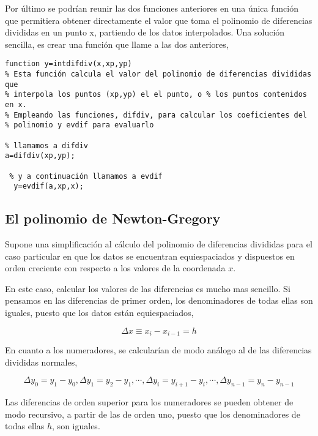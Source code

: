 Por último se podrían reunir las dos funciones anteriores en una única función que permitiera obtener directamente el valor que toma el polinomio de diferencias divididas en un punto x, partiendo de los datos interpolados. Una solución sencilla, es crear una función que llame a las dos anteriores,

\begin{lstlisting}
function y=intdifdiv(x,xp,yp)
% Esta función calcula el valor del polinomio de diferencias divididas que 
% interpola los puntos (xp,yp) el el punto, o % los puntos contenidos en x. 
% Empleando las funciones, difdiv, para calcular los coeficientes del
% polinomio y evdif para evaluarlo

% llamamos a difdiv
a=difdiv(xp,yp);
 
 % y a continuación llamamos a evdif
  y=evdif(a,xp,x);
 \end{lstlisting} 
 
 \subsection{El polinomio de Newton-Gregory} \label{sec:newgre}  
 Supone una simplificación al cálculo del polinomio de diferencias divididas para el caso particular en que los datos se encuentran equiespaciados y dispuestos en orden creciente con respecto a los valores de la coordenada $x$.
 
En este caso, calcular los valores de las diferencias es mucho mas sencillo.  Si pensamos en las diferencias de primer orden, los denominadores de todas ellas son iguales, puesto que los datos están equiespaciados,

\begin{equation*}
\Delta x \equiv x_i-x_{i-1} =h
\end{equation*}

En cuanto a los numeradores, se calcularían de modo análogo al de las diferencias divididas normales,

\begin{equation*}
\Delta y_0= y_1-y_0, \Delta y_1=y_2-y_1, \cdots, \Delta y_i=y_{i+1}-y_i, \cdots, \Delta y_{n-1}=y_{n}-y_{n-1}
\end{equation*}

Las diferencias de orden superior para los numeradores se pueden obtener de modo recursivo, a partir de las de orden uno, puesto que los denominadores de todas ellas $h$, son iguales.


